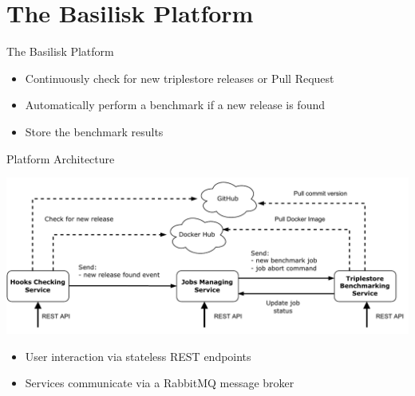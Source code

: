 \section{The Basilisk Platform}
\begin{frame}{The Basilisk Platform}
	\begin{itemize}
		\item Continuously check for new triplestore releases or Pull Request
		\item Automatically perform a benchmark if a new release is found
		\item Store the benchmark results
	\end{itemize}
	
	
\end{frame}

\begin{frame}{Platform Architecture}
	\centering
	
	\includegraphics[width=1\textwidth]{images/basilisk/high-level-design-approach.pdf}
	
	\begin{itemize}
		\item User interaction via stateless REST endpoints
		\item Services communicate via a RabbitMQ message broker
	\end{itemize}
	
\end{frame}